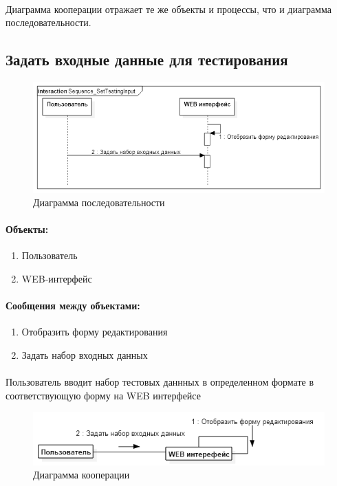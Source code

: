 \documentclass{article}
\begin{document}
        \paragraph{}
        Диаграмма кооперации отражает те же объекты и процессы, что и диаграмма
        последовательности.
    
    \subsection{Задать входные данные для тестирования}
        \begin{figure}[H]
            \includegraphics[width=\textwidth, center]
                {Sequence_SetTestingInput}
            \caption{Диаграмма последовательности}
        \end{figure}
        \paragraph{Объекты:}
        \begin{enumerate}
            \item Пользователь
            \item WEB-интерфейс
        \end{enumerate}
        \paragraph{Сообщения между объектами:}
        \begin{enumerate}
            \item Отобразить форму редактирования
            \item Задать набор входных данных
        \end{enumerate}
        \paragraph{}
        Пользователь вводит набор тестовых даннных в определенном формате
        в соответствующую форму на WEB интерфейсе
        \begin{figure}[H]
            \includegraphics[width=\textwidth, center]
                {Communication_SetTestingInput}
            \caption{Диаграмма кооперации}
        \end{figure}
\end{document}

